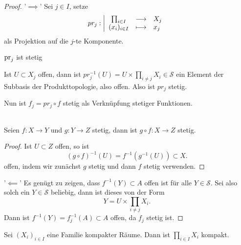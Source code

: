 \begin{proof}
    '$\implies$' Sei $j\in I$, setze
        \begin{equation*}
        pr_j: \left| \begin{array}{c c l} 
        \prod_{i\in I}  & \longrightarrow & X_j \\
        (x_i)_{i \in I} & \longmapsto &  x_j
        \end{array} \right.
    \end{equation*}
    als Projektion auf die $j$-te Komponente.
     \begin{claim}
        $\operatorname{pr}_j$ ist stetig
    \end{claim}
    \begin{subproof}
        Ist $U\subset X_j$ offen, dann ist $pr_j^{-1}(U) = U\times \prod_{i\neq j} X_i\in \mathcal{S}$ ein Element der Subbasis der Produkttopologie, also offen. Also ist $pr_j$ stetig.
    \end{subproof}
    Nun ist $f_j = pr_j \circ  f$ stetig als Verknüpfung stetiger Funktionen.
    \begin{recap}
        \\
        Seien $f:X\to Y$ und $g:Y\to Z$ stetig, dann ist $g\circ  f : X \to  Z$ stetig.
        \begin{proof}
            Ist $U\subset Z$ offen, so ist
            \[
                (g \circ  f) ^{-1}(U) = f^{-1}(g^{-1}(U)) \subset X
            .\] 
            offen, indem wir zunächst $g$ stetig und dann  $f$ stetig verwenden.
        \end{proof}
    \end{recap}
    '$\impliedby$' Es genügt zu zeigen, dass $f^{-1}(Y)\subset A$ offen ist für alle $Y\in \mathcal{S}$. Sei also solch ein $Y\in \mathcal{S}$ beliebig, dann ist dieses von der Form
    \[
    Y = U\times \prod_{i\neq j} X_i
    .\] 
    Dann ist $f^{-1}(Y) = f^{-1}_j(A)\subset A$ offen, da $f_j$ stetig ist.
\end{proof}
\begin{theorem}\label{thm:tychonoff}
    Sei $(X_i)_{i \in I}$ eine Familie kompakter Räume. Dann ist $\prod _{i \in I} X_i$ kompakt.
\end{theorem}
